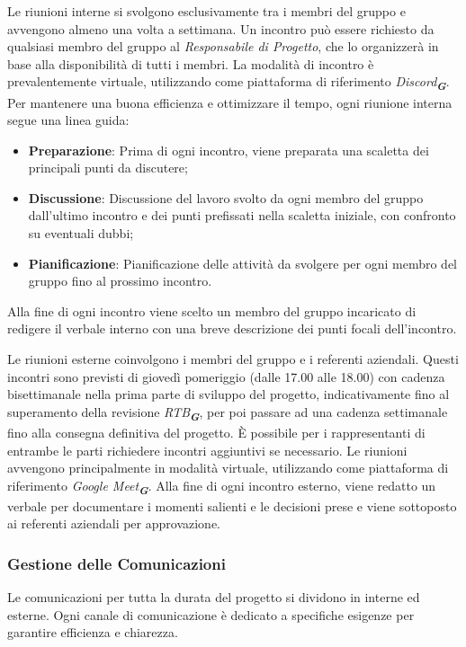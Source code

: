 Le riunioni interne si svolgono esclusivamente tra i membri del gruppo e avvengono almeno una volta a settimana. 
Un incontro può essere richiesto da qualsiasi membro del gruppo al \emph{Responsabile di Progetto}, che lo organizzerà in base alla disponibilità di tutti i membri. 
La modalità di incontro è prevalentemente virtuale, utilizzando come piattaforma di riferimento \emph{Discord}\textsubscript{\textit{\textbf{G}}}.
Per mantenere una buona efficienza e ottimizzare il tempo, ogni riunione interna segue una linea guida:
\begin{itemize}
    \item \textbf{Preparazione}: Prima di ogni incontro, viene preparata una scaletta dei principali punti da discutere;
    \item \textbf{Discussione}: Discussione del lavoro svolto da ogni membro del gruppo dall'ultimo incontro e dei punti prefissati nella scaletta iniziale, con confronto su eventuali dubbi;
    \item \textbf{Pianificazione}: Pianificazione delle attività da svolgere per ogni membro del gruppo fino al prossimo incontro.
\end{itemize}
Alla fine di ogni incontro viene scelto un membro del gruppo incaricato di redigere il verbale interno con una breve descrizione dei punti focali dell'incontro.

Le riunioni esterne coinvolgono i membri del gruppo e i referenti aziendali. Questi incontri sono previsti di giovedì pomeriggio (dalle 17.00 alle 18.00) con cadenza bisettimanale nella prima parte di sviluppo del progetto, 
indicativamente fino al superamento della revisione \emph{RTB}\textsubscript{\textit{\textbf{G}}}, per poi passare ad una cadenza settimanale fino alla consegna definitiva del progetto. 
È possibile per i rappresentanti di entrambe le parti richiedere incontri aggiuntivi se necessario.
Le riunioni avvengono principalmente in modalità virtuale, utilizzando come piattaforma di riferimento \emph{Google Meet}\textsubscript{\textit{\textbf{G}}}.
Alla fine di ogni incontro esterno, viene redatto un verbale per documentare i momenti salienti e le decisioni prese e viene sottoposto ai referenti aziendali per approvazione.

\subsubsection{Gestione delle Comunicazioni}
Le comunicazioni per tutta la durata del progetto si dividono in interne ed esterne. Ogni canale di comunicazione è dedicato a specifiche esigenze per garantire efficienza e chiarezza.

